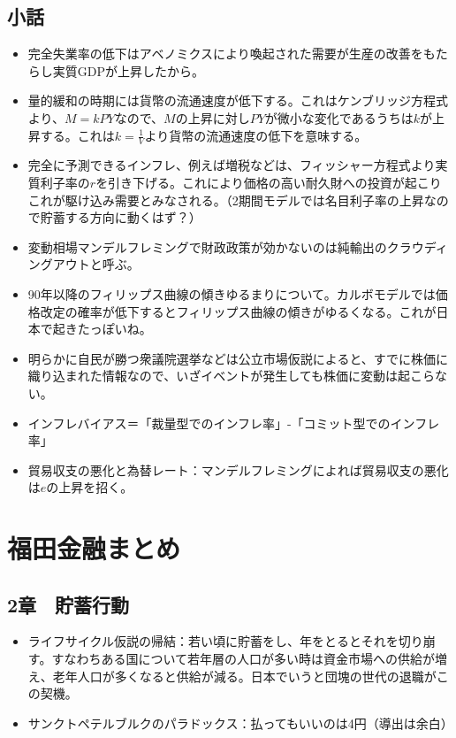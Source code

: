 \documentclass{jsarticle}
\begin{document}
\subsection{小話}
\begin{itemize}
	\item 完全失業率の低下はアベノミクスにより喚起された需要が生産の改善をもたらし実質GDPが上昇したから。
	\item 量的緩和の時期には貨幣の流通速度が低下する。これはケンブリッジ方程式より、$M = kPY$なので、$M$の上昇に対し$PY$が微小な変化であるうちは$k$が上昇する。これは$k = \frac{1}{V}$より貨幣の流通速度の低下を意味する。
	\item 完全に予測できるインフレ、例えば増税などは、フィッシャー方程式より実質利子率の$r$を引き下げる。これにより価格の高い耐久財への投資が起こりこれが駆け込み需要とみなされる。（2期間モデルでは名目利子率の上昇なので貯蓄する方向に動くはず？）
	\item 変動相場マンデルフレミングで財政政策が効かないのは純輸出のクラウディングアウトと呼ぶ。
	\item 90年以降のフィリップス曲線の傾きゆるまりについて。カルボモデルでは価格改定の確率が低下するとフィリップス曲線の傾きがゆるくなる。これが日本で起きたっぽいね。
	\item 明らかに自民が勝つ衆議院選挙などは公立市場仮説によると、すでに株価に織り込まれた情報なので、いざイベントが発生しても株価に変動は起こらない。
	\item インフレバイアス＝「裁量型でのインフレ率」-「コミット型でのインフレ率」
	\item 貿易収支の悪化と為替レート：マンデルフレミングによれば貿易収支の悪化は$e$の上昇を招く。
\end{itemize}


\section{福田金融まとめ}
\subsection{2章　貯蓄行動}
\begin{itemize}
	\item ライフサイクル仮説の帰結：若い頃に貯蓄をし、年をとるとそれを切り崩す。すなわちある国について若年層の人口が多い時は資金市場への供給が増え、老年人口が多くなると供給が減る。日本でいうと団塊の世代の退職がこの契機。
	\item サンクトペテルブルクのパラドックス：払ってもいいのは4円（導出は余白）
\end{itemize}
\end{document}
